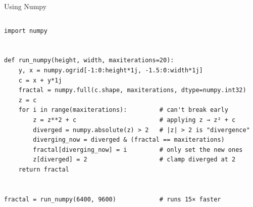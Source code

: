 \documentclass[aspectratio=169]{beamer}
\begin{document}
\begin{frame}[fragile]{Using Numpy}
\begin{columns}
\small
\begin{verbatim}
import numpy


def run_numpy(height, width, maxiterations=20):
    y, x = numpy.ogrid[-1:0:height*1j, -1.5:0:width*1j]
    c = x + y*1j
    fractal = numpy.full(c.shape, maxiterations, dtype=numpy.int32)
    z = c
    for i in range(maxiterations):         # can't break early
        z = z**2 + c                       # applying z → z² + c
        diverged = numpy.absolute(z) > 2   # |z| > 2 is "divergence"
        diverging_now = diverged & (fractal == maxiterations)
        fractal[diverging_now] = i         # only set the new ones
        z[diverged] = 2                    # clamp diverged at 2
    return fractal


fractal = run_numpy(6400, 9600)            # runs 15× faster
\end{verbatim}
\end{columns}
\end{frame}
\end{document}
